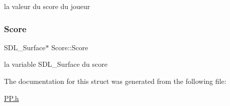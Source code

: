 la valeur du score du joueur \mbox{\label{structScore_aa1e07a19fbd1cb60bd7358b64ffac283}} 
\subsubsection{\texorpdfstring{Score}{Score}}
{\footnotesize\ttfamily S\+D\+L\+\_\+\+Surface$\ast$ Score\+::\+Score}

la variable S\+D\+L\+\_\+\+Surface du score 

The documentation for this struct was generated from the following file\+:\begin{DoxyCompactItemize}
\item 
\hyperlink{PP_8h}{P\+P.\+h}\end{DoxyCompactItemize}
